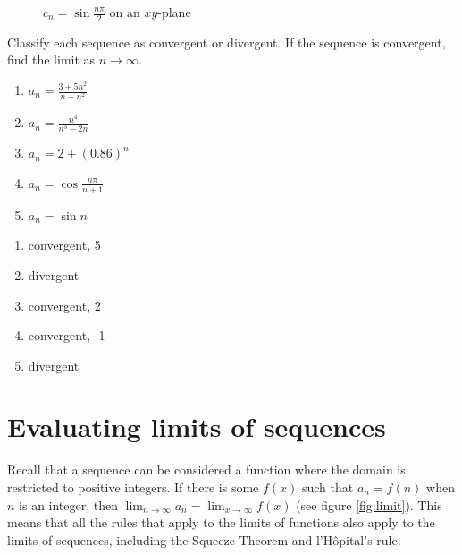 \begin{figure}[H]
    \centering
    \caption{$c_n =\sin{\frac{n\pi}{2}}$ on an $xy$-plane}
    \label{fig:sineseq}
\end{figure}

\begin{Exercise}[label=seqcalc3]
    Classify each sequence as convergent or divergent. If the sequence is
    convergent, find the limit as $n \to \infty$.
    \begin{enumerate}
        \item $a_n = \frac{3 + 5n^2}{n + n^2}$
        \item $a_n = \frac{n^4}{n^3 - 2n}$
        \item $a_n = 2 + (0.86)^n$
        \item $a_n = \cos{\frac{n\pi}{n+1}}$
        \item $a_n = \sin{n}$
    \end{enumerate}
\end{Exercise}

\begin{Answer}[ref=seqcalc3]
    \begin{enumerate}
        \item convergent, 5
        \item divergent
        \item convergent, 2
        \item convergent, -1
        \item divergent
    \end{enumerate}
\end{Answer}

\section{Evaluating limits of sequences}
Recall that a sequence can be considered a function where the domain is
restricted to positive integers. If there is some $f(x)$ such that $a_n = f(n)$
when $n$ is an integer, then $\lim_{n \to \infty} a_n = \lim_{x \to \infty}
    f(x)$ (see figure \ref{fig:limit}). This means that all the rules that apply to
the limits of functions also apply to the limits of sequences, including the
Squeeze Theorem and l'H\^{o}pital's rule.

